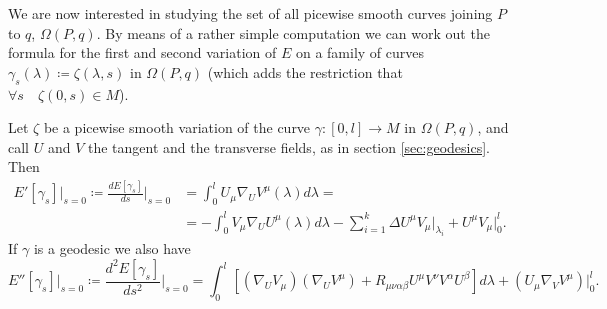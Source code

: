 We are now interested in studying the set of all picewise smooth curves joining \(P\) to \(q\), \(\Omega(P, q)\). By means of a rather simple computation we can work out the formula for the first and second variation of \(E\) on a family of curves \(\gamma_s(\lambda) \coloneqq
\zeta(\lambda, s)\) in \(\Omega(P, q)\) (which adds the restriction that \(\forall s \quad \zeta(0, s) \in M\)).

\begin{lemma}
	Let \(\zeta\) be a picewise smooth variation of the curve \(\gamma: [0, l] \rightarrow M\)  in \(\Omega(P, q)\), and call \(U\) and \(V\) the tangent and the transverse fields, as in section \ref{sec:geodesics}. Then
	\begin{align}
		E'[\gamma_s]\vert_{s = 0} \coloneqq \frac{dE[\gamma_s]}{ds}\Big\vert_{s = 0} &= 
		\int_{0}^{l} U_{\mu}\nabla_UV^{\mu}(\lambda) d\lambda = \\
		&= - \int_{0}^{l}  V_{\mu}\nabla_UU^{\mu}(\lambda) d\lambda - \sum_{i = 1}^{k} \Delta U^{\mu}V_{\mu}\Big\vert_{\lambda_i} + U^{\mu}V_{\mu}\Big\vert^l_0.
		\label{eq:first-E-var}
	\end{align}
	If \(\gamma\) is a geodesic we also have
	\begin{equation}
		\label{eq:second-E-var}
		E''[\gamma_s]\vert_{s = 0} \coloneqq \frac{d^2E[\gamma_s]}{ds^2}\Big\vert_{s = 0} = 
		\int_{0}^{l} \left[(\nabla_UV_{\mu})(\nabla_UV^{\mu}) + R_{\mu\nu\alpha\beta}U^{\mu}V^{\nu}V^{\alpha}U^{\beta}\right] d\lambda + (U_{\mu}\nabla_VV^{\mu})\Big\vert_0^l.
	\end{equation}
	
\end{lemma}

